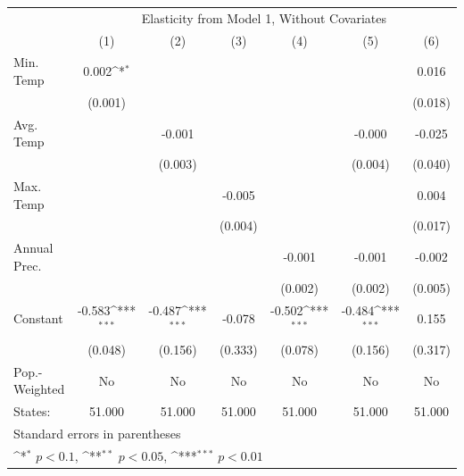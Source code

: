 {
\def\sym#1{\ifmmode^{#1}\else\(^{#1}\)\fi}
\begin{tabular}{l*{6}{c}}
\hline\hline
            &\multicolumn{6}{c}{Elasticity from Model 1, Without Covariates}                                                                    \\
            &\multicolumn{1}{c}{(1)}         &\multicolumn{1}{c}{(2)}         &\multicolumn{1}{c}{(3)}         &\multicolumn{1}{c}{(4)}         &\multicolumn{1}{c}{(5)}         &\multicolumn{1}{c}{(6)}         \\
\hline
Min. Temp   &       0.002\sym{*}  &                     &                     &                     &                     &       0.016         \\
            &     (0.001)         &                     &                     &                     &                     &     (0.018)         \\
[1em]
Avg. Temp   &                     &      -0.001         &                     &                     &      -0.000         &      -0.025         \\
            &                     &     (0.003)         &                     &                     &     (0.004)         &     (0.040)         \\
[1em]
Max. Temp   &                     &                     &      -0.005         &                     &                     &       0.004         \\
            &                     &                     &     (0.004)         &                     &                     &     (0.017)         \\
[1em]
Annual Prec.&                     &                     &                     &      -0.001         &      -0.001         &      -0.002         \\
            &                     &                     &                     &     (0.002)         &     (0.002)         &     (0.005)         \\
[1em]
Constant    &      -0.583\sym{***}&      -0.487\sym{***}&      -0.078         &      -0.502\sym{***}&      -0.484\sym{***}&       0.155         \\
            &     (0.048)         &     (0.156)         &     (0.333)         &     (0.078)         &     (0.156)         &     (0.317)         \\
\hline
Pop.-Weighted&          No         &          No         &          No         &          No         &          No         &          No         \\
States:     &      51.000         &      51.000         &      51.000         &      51.000         &      51.000         &      51.000         \\
\hline\hline
\multicolumn{7}{l}{\footnotesize Standard errors in parentheses}\\
\multicolumn{7}{l}{\footnotesize \sym{*} \(p<0.1\), \sym{**} \(p<0.05\), \sym{***} \(p<0.01\)}\\
\end{tabular}
}
